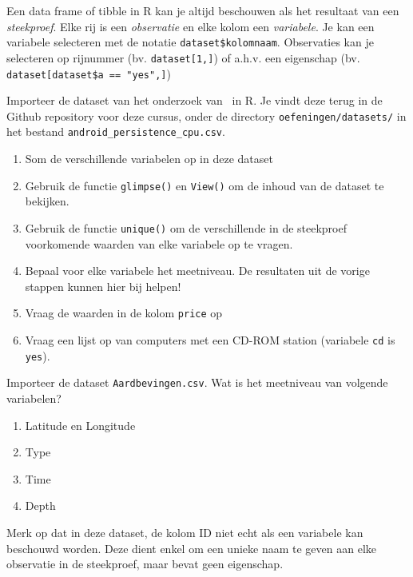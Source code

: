 Een data frame of tibble in R kan je altijd beschouwen als het resultaat van een \textit{steekproef}. Elke rij is een \textit{observatie} en elke kolom een \textit{variabele}. Je kan een variabele selecteren met de notatie \texttt{dataset\$kolomnaam}. Observaties kan je selecteren op rijnummer (bv. \texttt{dataset[1,]}) of a.h.v. een eigenschap (bv. \verb|dataset[dataset$a == "yes",]|)

\begin{exercise}
  Importeer de dataset van het onderzoek van~\textcite{Akin2016} in R. Je vindt deze terug in de Github repository voor deze cursus, onder de directory \texttt{oefeningen/datasets/} in het bestand \texttt{android\_persistence\_cpu.csv}.
  
  \begin{enumerate}
    \item Som de verschillende variabelen op in deze dataset
    \item Gebruik de functie \texttt{glimpse()} en \texttt{View()} om de inhoud van de dataset te bekijken.
    \item Gebruik de functie \texttt{unique()} om de verschillende in de steekproef voorkomende waarden van elke variabele op te vragen.
    \item Bepaal voor elke variabele het meetniveau. De resultaten uit de vorige stappen kunnen hier bij helpen!
    \item Vraag de waarden in de kolom \texttt{price} op
    \item Vraag een lijst op van computers met een CD-ROM station (variabele \texttt{cd} is \texttt{yes}).
  \end{enumerate}
\end{exercise}

\begin{exercise}
  Importeer de dataset \texttt{Aardbevingen.csv}. Wat is het meetniveau van volgende variabelen?
  
  \begin{enumerate}
    \item Latitude en Longitude
    \item Type
    \item Time
    \item Depth
  \end{enumerate}

  Merk op dat in deze dataset, de kolom ID niet echt als een variabele kan beschouwd worden. Deze dient enkel om een unieke naam te geven aan elke observatie in de steekproef, maar bevat geen eigenschap.
\end{exercise}

